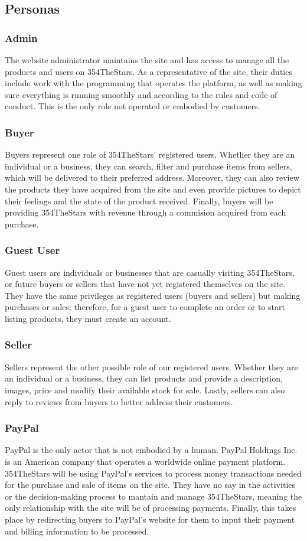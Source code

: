 \documentclass[11pt]{article}
\newcounter{use case ID}
\begin{document}
\subsection{Personas} \label{actors}
\subsubsection{Admin}
The website administrator maintains the site and has access to manage all the
products and users on 354TheStars. As a representative of the site, their duties include
work with the programming that operates the platform, as well as making sure
everything is running smoothly and according to the rules and code of conduct.
This is the only role not operated or embodied by customers.
\subsubsection{Buyer}
Buyers represent one role of 354TheStars' registered users. Whether they are
an individual or a business, they can search, filter and purchase items from sellers,
which will be delivered to their preferred address. Moreover, they can also review
the products they have acquired from the site and even provide pictures to depict
their feelings and the state of the product received. Finally, buyers will be providing
354TheStars with revenue through a commision acquired from each purchase.
\subsubsection{Guest User}
Guest users are individuals or businesses that are casually visiting 354TheStars,
or future buyers or sellers that have not yet registered themselves on the site.
They have the same privileges as registered users (buyers and sellers) but making
purchases or sales; therefore, for a guest user to complete an order or
to start listing products, they must create an account.
\subsubsection{Seller}
Sellers represent the other possible role of our registered users. Whether they are
an individual or a business, they can list products and provide a description,
images, price and modify their available stock for sale. Lastly, sellers can also
reply to reviews from buyers to better address their customers.
\subsubsection{PayPal}
PayPal is the only actor that is not embodied by a human. PayPal Holdings Inc. is
an American company that operates a worldwide online payment platform. 354TheStars
will be using PayPal's services to process money transactions needed for the purchase
and sale of items on the site. They have no say in the activities or the
decision-making process to mantain and manage 354TheStars, meaning the only
relationship with the site will be of processing payments. Finally, this takes
place by redirecting buyers to PayPal's website for them to input their payment
and billing information to be processed.
\end{document}
